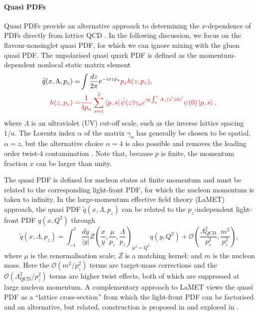 \paragraph{Quasi PDFs}
Quasi PDFs provide an alternative approach to determining the $x$-dependence of PDFs directly from lattice QCD \cite{Ji:2013dva,Ji:2014gla}. In the following discussion, we focus on the flavour-nonsinglet quasi PDF, for which we can ignore mixing with the gluon quasi PDF. The unpolarised quasi quark PDF is defined as the momentum-dependent
nonlocal static matrix element
\begin{align}\label{eq:qPDF}
\widetilde{q}(x,\Lambda,p_z)  =& \int {{dz}\over {2\pi}} e^{-i x z p_z} {\color{red}p_z h(z,p_z)}, \nonumber \\
{\color{red}h(z,p_z) =}&
{\color{red}{{1}\over {4 p_{\alpha}}}\sum_{s=1}^2\left\langle p,s\right\vert \bar{\psi}(z)\gamma_\alpha e^{ig\int_0^z
A_z(z^\prime) dz^\prime} \psi(0) \left\vert p,s\right\rangle ,}
\end{align}
where $\Lambda$ is an ultraviolet (UV) cut-off scale, such as the inverse lattice spacing $1/a$. The Lorentz index $\alpha$ of the matrix $\gamma_\alpha$ has generally be chosen to be spatial, $\alpha = z$, but the alternative choice $\alpha = 4$ is also possible and removes  the leading order twist-4 contamination \cite{Radyushkin:2016hsy}.  Note that, because $p$ is finite, the momentum fraction $x$ can be larger than unity.

The quasi PDF is defined for nucleon states at finite momentum and must be related to the corresponding light-front PDF, for which the nucleon momentum is taken to infinity.
In the  large-momentum  effective field theory (LaMET) approach, the quasi PDF $\widetilde{q}(x,\Lambda,p_z)$ can be related to the $p_z$-independent
light-front PDF $q(x,Q^2)$ through~\cite{Ji:2013dva,Ji:2014gla}
\begin{equation} \label{eq:qPDFmatching}
\widetilde{q}(x,\Lambda ,p_z) = 
  \int_{-1}^1 \frac{dy}{\left\vert y\right\vert} 
    Z\left( \frac{x}{y}, \frac{\mu}{p_z}, \frac{\Lambda}{p_z}\right)_{\mu^2 = Q^2} q(y,Q^2) +
  \mathcal{O}\left( \frac{\Lambda_\text{QCD}^2}{p_z^2},\frac{m^2}{p_z^2}\right), 
\end{equation}
where $\mu$ is the renormalisation scale;
$Z$ is a matching kernel; and $m$ is the nucleon mass.
Here the $\mathcal{O}\left(m^2/p_z^2\right)$ terms are target-mass corrections and the $ \mathcal{O}\left(\Lambda_\text{QCD}^2/p_z^2\right)$ terms are higher twist effects, both of which are suppressed at large nucleon momentum. A complementary approach to LaMET views the quasi PDF as a ``lattice cross-section'' from which the light-front PDF can be factorised \cite{Ma:2014jla, Ma:2014jga,Ma:2017pxb} and an alternative, but related, construction is proposed in \cite{Radyushkin:2016hsy,Radyushkin:2017cyf} and explored in \cite{Orginos:2017kos}.

